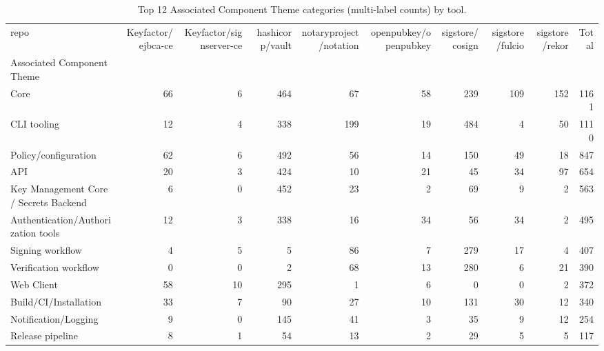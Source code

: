 \begin{table}[t]
\centering
\caption{Top 12 Associated Component Theme categories (multi-label counts) by tool.}
\label{tab:phase3-associated-component-theme}
\scriptsize
\begin{tabular}{lrrrrrrrrr}
\toprule
repo & Keyfactor/ejbca-ce & Keyfactor/signserver-ce & hashicorp/vault & notaryproject/notation & openpubkey/openpubkey & sigstore/cosign & sigstore/fulcio & sigstore/rekor & Total \\
Associated Component Theme &  &  &  &  &  &  &  &  &  \\
\midrule
Core & 66 & 6 & 464 & 67 & 58 & 239 & 109 & 152 & 1161 \\
CLI tooling & 12 & 4 & 338 & 199 & 19 & 484 & 4 & 50 & 1110 \\
Policy/configuration & 62 & 6 & 492 & 56 & 14 & 150 & 49 & 18 & 847 \\
API & 20 & 3 & 424 & 10 & 21 & 45 & 34 & 97 & 654 \\
Key Management Core / Secrets Backend & 6 & 0 & 452 & 23 & 2 & 69 & 9 & 2 & 563 \\
Authentication/Authorization tools & 12 & 3 & 338 & 16 & 34 & 56 & 34 & 2 & 495 \\
Signing workflow & 4 & 5 & 5 & 86 & 7 & 279 & 17 & 4 & 407 \\
Verification workflow & 0 & 0 & 2 & 68 & 13 & 280 & 6 & 21 & 390 \\
Web Client & 58 & 10 & 295 & 1 & 6 & 0 & 0 & 2 & 372 \\
Build/CI/Installation & 33 & 7 & 90 & 27 & 10 & 131 & 30 & 12 & 340 \\
Notification/Logging & 9 & 0 & 145 & 41 & 3 & 35 & 9 & 12 & 254 \\
Release pipeline & 8 & 1 & 54 & 13 & 2 & 29 & 5 & 5 & 117 \\
\bottomrule
\end{tabular}

\end{table}
